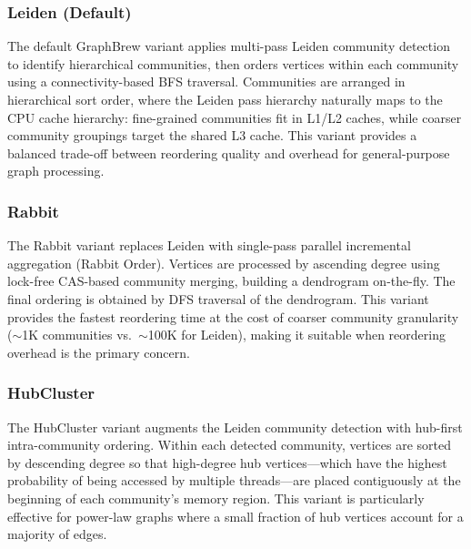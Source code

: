 \documentclass[sigconf, nonacm]{acmart}
\begin{document}
\subsubsection{Leiden (Default)}
The default GraphBrew variant applies multi-pass Leiden community detection to identify hierarchical communities, then orders vertices within each community using a connectivity-based BFS traversal. Communities are arranged in hierarchical sort order, where the Leiden pass hierarchy naturally maps to the CPU cache hierarchy: fine-grained communities fit in L1/L2 caches, while coarser community groupings target the shared L3 cache. This variant provides a balanced trade-off between reordering quality and overhead for general-purpose graph processing.

\subsubsection{Rabbit}
The Rabbit variant replaces Leiden with single-pass parallel incremental aggregation (Rabbit Order). Vertices are processed by ascending degree using lock-free CAS-based community merging, building a dendrogram on-the-fly. The final ordering is obtained by DFS traversal of the dendrogram. This variant provides the fastest reordering time at the cost of coarser community granularity (${\sim}$1K communities vs.\ ${\sim}$100K for Leiden), making it suitable when reordering overhead is the primary concern.

\subsubsection{HubCluster}
The HubCluster variant augments the Leiden community detection with hub-first intra-community ordering. Within each detected community, vertices are sorted by descending degree so that high-degree hub vertices---which have the highest probability of being accessed by multiple threads---are placed contiguously at the beginning of each community's memory region. This variant is particularly effective for power-law graphs where a small fraction of hub vertices account for a majority of edges.
\end{document}
